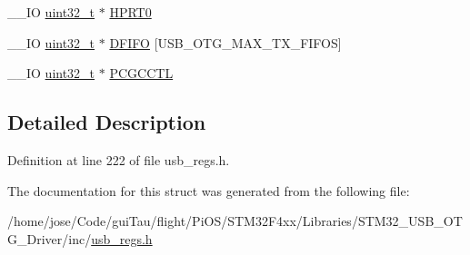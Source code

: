 \begin{DoxyCompactItemize}
\item 
\-\_\-\-\_\-\-I\-O \hyperlink{stdint_8h_a435d1572bf3f880d55459d9805097f62}{uint32\-\_\-t} $\ast$ \hyperlink{group___u_s_b___o_t_g___d_r_i_v_e_r_gad1f621c1434b61b89b306a5f3f9e1125}{H\-P\-R\-T0}
\item 
\-\_\-\-\_\-\-I\-O \hyperlink{stdint_8h_a435d1572bf3f880d55459d9805097f62}{uint32\-\_\-t} $\ast$ \hyperlink{group___u_s_b___o_t_g___d_r_i_v_e_r_ga0c14897a61771cef53ec091dfbb93694}{D\-F\-I\-F\-O} \mbox{[}U\-S\-B\-\_\-\-O\-T\-G\-\_\-\-M\-A\-X\-\_\-\-T\-X\-\_\-\-F\-I\-F\-O\-S\mbox{]}
\item 
\-\_\-\-\_\-\-I\-O \hyperlink{stdint_8h_a435d1572bf3f880d55459d9805097f62}{uint32\-\_\-t} $\ast$ \hyperlink{group___u_s_b___o_t_g___d_r_i_v_e_r_gae5fe2df4421b19989a06769f2fa772e0}{P\-C\-G\-C\-C\-T\-L}
\end{DoxyCompactItemize}


\subsection{Detailed Description}


Definition at line 222 of file usb\-\_\-regs.\-h.



The documentation for this struct was generated from the following file\-:\begin{DoxyCompactItemize}
\item 
/home/jose/\-Code/gui\-Tau/flight/\-Pi\-O\-S/\-S\-T\-M32\-F4xx/\-Libraries/\-S\-T\-M32\-\_\-\-U\-S\-B\-\_\-\-O\-T\-G\-\_\-\-Driver/inc/\hyperlink{_s_t_m32_f4xx_2_libraries_2_s_t_m32___u_s_b___o_t_g___driver_2inc_2usb__regs_8h}{usb\-\_\-regs.\-h}\end{DoxyCompactItemize}
